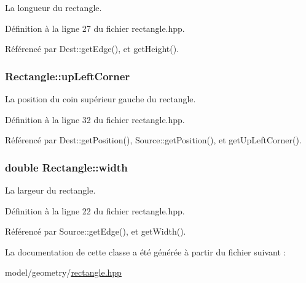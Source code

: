 La longueur du rectangle. 



Définition à la ligne 27 du fichier rectangle.\+hpp.



Référencé par Dest\+::get\+Edge(), et get\+Height().

\hypertarget{classRectangle_aeeb6ca62aa27e964265c92d1ea25d511}{}
\subsubsection[{up\+Left\+Corner}]{ Rectangle\+::up\+Left\+Corner\hspace{0.3cm}{\ttfamily [protected]}}\label{classRectangle_aeeb6ca62aa27e964265c92d1ea25d511}


La position du coin supérieur gauche du rectangle. 



Définition à la ligne 32 du fichier rectangle.\+hpp.



Référencé par Dest\+::get\+Position(), Source\+::get\+Position(), et get\+Up\+Left\+Corner().

\hypertarget{classRectangle_ac2c47512ca05c56cec73c32bb693d479}{}
\subsubsection[{width}]{\setlength{\rightskip}{0pt plus 5cm}double Rectangle\+::width\hspace{0.3cm}{\ttfamily [protected]}}\label{classRectangle_ac2c47512ca05c56cec73c32bb693d479}


La largeur du rectangle. 



Définition à la ligne 22 du fichier rectangle.\+hpp.



Référencé par Source\+::get\+Edge(), et get\+Width().



La documentation de cette classe a été générée à partir du fichier suivant \+:\begin{DoxyCompactItemize}
\item 
model/geometry/\hyperlink{rectangle_8hpp}{rectangle.\+hpp}\end{DoxyCompactItemize}
